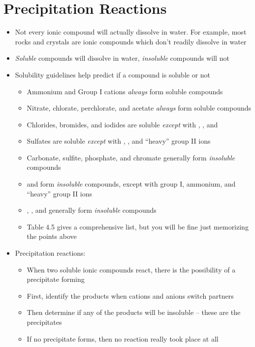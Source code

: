 \documentclass[12pt, openany, letterpaper]{memoir}
\begin{document}
\section{Precipitation Reactions}
\begin{itemize}
	\item Not every ionic compound will actually dissolve in water. For example, most rocks and crystals are ionic compounds which don't readily dissolve in water
	\item \emph{Soluble} compounds will dissolve in water, \emph{insoluble} compounds will not
	\item Solubility guidelines help predict if a compound is soluble or not
	      \begin{itemize}
		      \item Ammonium and Group I cations \emph{always} form soluble compounds
		      \item Nitrate, chlorate, perchlorate, and acetate \emph{always} form soluble compounds
		      \item Chlorides, bromides, and iodides are soluble \emph{except} with , , and 
		      \item Sulfates are soluble \emph{except} with , , and ``heavy'' group II ions
		      \item Carbonate, sulfite, phosphate, and chromate generally form \emph{insoluble} compounds
		      \item {} and  form \emph{insoluble} compounds, except with group I, ammonium, and ``heavy'' group II ions
		      \item {}, , and  generally form \emph{insoluble} compounds
		      \item Table 4.5 gives a comprehensive list, but you will be fine just memorizing the points above
	      \end{itemize}
	\item Precipitation reactions:
	      \begin{itemize}
		      \item When two soluble ionic compounds react, there is the possibility of a precipitate forming
		      \item First, identify the products when cations and anions switch partners
		      \item Then determine if any of the products will be insoluble -- these are the precipitates
		      \item If no precipitate forms, then no reaction really took place at all

\end{itemize}
\end{itemize}
\end{document}
